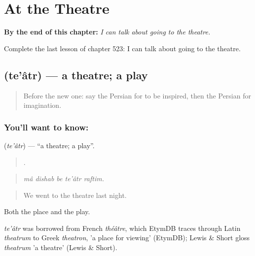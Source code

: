 
\chapter{At the Theatre}
\label{ch:fa-at-the-theatre}

\begin{chapteropening}
\textbf{By the end of this chapter:} \emph{I can talk about going to the theatre.}

Complete the last lesson of chapter 523: I can talk about going to the theatre.
\end{chapteropening}

\section[\texorpdfstring{\fa{تئاتر} (te'âtr)}{تئاتر (te'âtr)}]{ (te'âtr) — a theatre; a play}

\label{lesson:FA-C523-teatr}



\begin{quote}
Before the new one: say the Persian for to be inspired, then the Persian for imagination.
\end{quote}

\subsection*{You'll want to know: }
\textbf{} (\emph{te'âtr}) — \textquotedblleft{}a theatre; a play\textquotedblright{}.

\begin{quote}
    .
\end{quote}

\begin{quote}
\emph{mâ dishab be te'âtr raftim.}
\end{quote}

\begin{quote}
We went to the theatre last night.
\end{quote}

Both the place and the play.

\begin{cousinweb}
\emph{te'âtr} was borrowed from French \emph{théâtre}, which EtymDB traces through Latin \emph{theatrum} to Greek \emph{theatron}, 'a place for viewing' (EtymDB); Lewis \& Short gloss \emph{theatrum} 'a theatre' (Lewis \& Short).
\end{cousinweb}

